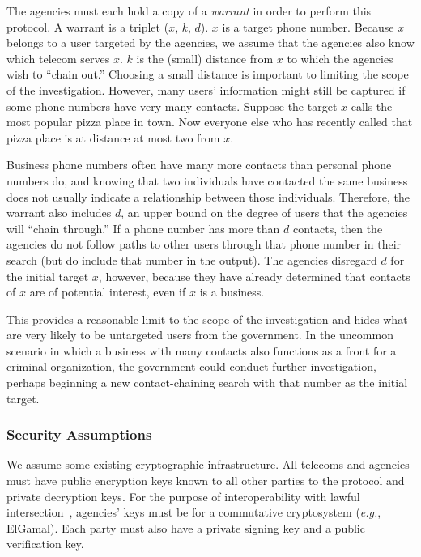 The agencies must each hold a copy of a \emph{warrant} in order to perform this protocol. A warrant is a triplet ($x$, $k$, $d$). $x$ is a target phone number. Because $x$ belongs to a user targeted by the agencies, we assume that the agencies also know which telecom serves $x$. $k$ is the (small) distance from $x$ to which the agencies wish to ``chain out.'' 
Choosing a small distance is important to limiting the scope of the investigation. However, many users' information might still be captured if some phone numbers have very many contacts. Suppose the target $x$ calls the most popular pizza place in town. Now everyone else who has recently called that pizza place is at distance at most two from $x$.

Business phone numbers often have many more contacts than personal
phone numbers do, and knowing that two individuals have contacted
the same business does not usually indicate
a relationship between those individuals.
Therefore, the warrant also includes $d$, an upper bound on the
degree of users that the agencies will ``chain through.'' If a phone
number has more than $d$ contacts, then the agencies do not follow paths to
other users through that phone number in their search (but do include that
number in the output). The agencies disregard $d$ for the initial target $x$,
however, because they have already determined that contacts of $x$ are of
potential interest, even if $x$ is a business. 

This provides a reasonable limit to the scope of the investigation and hides what are very likely to be untargeted users from the government. In the uncommon scenario in which a business with many contacts also functions as a front for a criminal organization, the government could conduct further investigation, perhaps beginning a new contact-chaining search with that number as the initial target.

\subsubsection{Security Assumptions}

We assume some existing cryptographic infrastructure. 
All telecoms and agencies must have public encryption keys known to all other parties to the protocol and private decryption keys. 
For the purpose of interoperability with lawful intersection~\cite{sff-foci2014}, agencies' keys must be for a commutative cryptosystem ({\it e.g.}, ElGamal). 
Each party must also have a private signing key and a public verification key.

